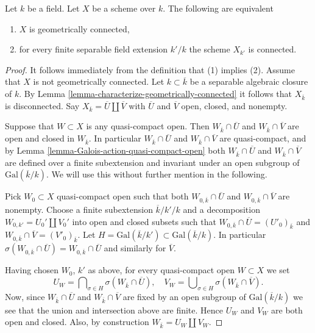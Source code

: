 \begin{lemma}
\label{lemma-characterize-geometrically-disconnected}
Let $k$ be a field.
Let $X$ be a scheme over $k$.
The following are equivalent
\begin{enumerate}
\item $X$ is geometrically connected,
\item for every finite separable field extension $k'/k$
the scheme $X_{k'}$ is connected.
\end{enumerate}
\end{lemma}

\begin{proof}
It follows immediately from the definition that (1) implies (2).
Assume that $X$ is not geometrically connected.
Let $k \subset \overline{k}$ be a separable algebraic
closure of $k$. By
Lemma \ref{lemma-characterize-geometrically-connected}
it follows that $X_{\overline{k}}$ is disconnected.
Say $X_{\overline{k}} = \overline{U} \amalg \overline{V}$
with $\overline{U}$ and $\overline{V}$ open, closed, and nonempty.

\medskip\noindent
Suppose that $W \subset X$ is any quasi-compact open.
Then $W_{\overline{k}} \cap \overline{U}$ and
$W_{\overline{k}} \cap \overline{V}$ are open and closed in
$W_{\overline{k}}$. In particular $W_{\overline{k}} \cap \overline{U}$ and
$W_{\overline{k}} \cap \overline{V}$ are quasi-compact, and by
Lemma \ref{lemma-Galois-action-quasi-compact-open}
both $W_{\overline{k}} \cap \overline{U}$ and
$W_{\overline{k}} \cap \overline{V}$
are defined over a finite subextension and invariant under an
open subgroup of $\text{Gal}(\overline{k}/k)$.
We will use this without further mention in the following.

\medskip\noindent
Pick $W_0 \subset X$ quasi-compact open such that both
$W_{0, \overline{k}} \cap \overline{U}$ and
$W_{0, \overline{k}} \cap \overline{V}$ are nonempty.
Choose a finite subextension $\overline{k}/k'/k$
and a decomposition $W_{0, k'} = U_0' \amalg V_0'$ into open and closed
subsets such that
$W_{0, \overline{k}} \cap \overline{U} = (U'_0)_{\overline{k}}$ and
$W_{0, \overline{k}} \cap \overline{V} = (V'_0)_{\overline{k}}$.
Let $H = \text{Gal}(\overline{k}/k') \subset \text{Gal}(\overline{k}/k)$.
In particular
$\sigma(W_{0, \overline{k}} \cap \overline{U}) =
W_{0, \overline{k}} \cap \overline{U}$ and similarly for
$\overline{V}$.

\medskip\noindent
Having chosen $W_0$, $k'$ as above, for every quasi-compact open
$W \subset X$ we set
$$
U_W =
\bigcap\nolimits_{\sigma \in H} \sigma(W_{\overline{k}} \cap \overline{U}),
\quad
V_W =
\bigcup\nolimits_{\sigma \in H} \sigma(W_{\overline{k}} \cap \overline{V}).
$$
Now, since $W_{\overline{k}} \cap \overline{U}$ and
$W_{\overline{k}} \cap \overline{V}$ are fixed by an open subgroup of
$\text{Gal}(\overline{k}/k)$ we see that the union and intersection
above are finite. Hence $U_W$ and $V_W$ are both open and closed.
Also, by construction $W_{\bar k} = U_W \amalg V_W$.


\end{proof}

